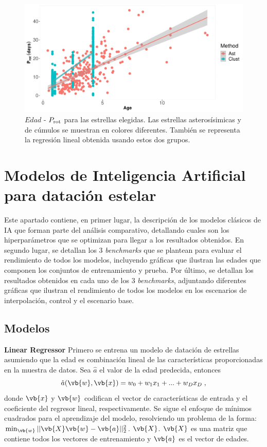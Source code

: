 \begin{figure}[H]
\begin{center}
 \includegraphics[width=0.8\linewidth]{Figuras/Age_Prot_embedded.pdf}
\end{center}
\caption{$Edad$ - $P_{\rm rot}$ para las estrellas elegidas. Las estrellas asterosísimicas y de cúmulos se muestran en colores diferentes. También se representa la regresión lineal obtenida usando estos dos grupos.}
 \label{Fig:Age_rot}
\end{figure}


\chapter{Modelos de Inteligencia Artificial para datación estelar}
\label{chap:AI_4_date} 
Este apartado contiene, en primer lugar, la descripción de los modelos clásicos de IA que forman parte del análisis comparativo, detallando cuales son los hiperparámetros que se optimizan para llegar a los resultados obtenidos. En segundo lugar, se detallan los 3 \emph{benchmarks} que se plantean para evaluar el rendimiento de todos los modelos, incluyendo gráficas que ilustran las edades que componen los conjuntos de entrenamiento y prueba. Por último, se detallan los resultados obtenidos en cada uno de los 3 \emph{benchmarks}, adjuntando diferentes gráficas que ilustran el rendimiento de todos los modelos en los escenarios de interpolación, control y el escenario base.

\section{Modelos}
\label{sec:models}

\textbf{Linear Regressor} {} Primero se entrena un modelo de datación de estrellas asumiendo que la edad es combinación lineal de las características proporcionadas en la muestra de datos. Sea $\hat{a}$ el valor de la edad predecida, entonces
\begin{equation}
\hat{a}(\vb{w}, \vb{x}) = w_0 + w_1 x_1 + ... + w_D x_D \; ,
\end{equation}
donde $\vb{x}$ y $\vb{w}$ codifican el vector de características de entrada y el coeficiente del regresor lineal, respectivamente. Se sigue el enfoque de mínimos cuadrados para el aprendizaje del modelo, resolviendo un problema de la forma: $\min_{\vb{w}} || \vb{X} \vb{w} - \vb{a}||_2^2$. $\vb{X}$. $\vb{X}$ es una matriz que contiene todos los vectores de entrenamiento y $\vb{a}$ es el vector de edades. 

